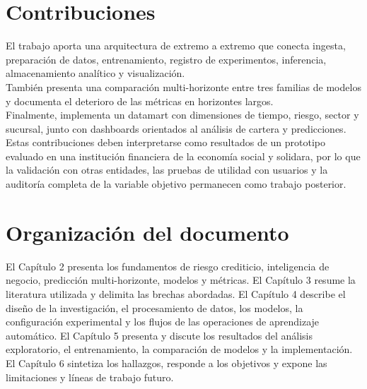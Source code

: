 \section{Contribuciones}

El trabajo aporta una arquitectura de extremo a extremo que conecta ingesta, preparación de datos, entrenamiento, registro de experimentos, inferencia, almacenamiento analítico y visualización.\\

También presenta una comparación multi-horizonte entre tres familias de modelos y documenta el deterioro de las métricas en horizontes largos.\\

Finalmente, implementa un datamart con dimensiones de tiempo, riesgo, sector y sucursal, junto con dashboards orientados al análisis de cartera y predicciones.\\

Estas contribuciones deben interpretarse como resultados de un prototipo evaluado en una institución financiera de la economía social y solidara, por lo que la validación con otras entidades, las pruebas de utilidad con usuarios y la auditoría completa de la variable objetivo permanecen como trabajo posterior.

\section{Organización del documento}

El Capítulo 2 presenta los fundamentos de riesgo crediticio, inteligencia de negocio, predicción multi-horizonte, modelos y métricas. El Capítulo 3 resume la literatura utilizada y delimita las brechas abordadas. El Capítulo 4 describe el diseño de la investigación, el procesamiento de datos, los modelos, la configuración experimental y los flujos de las operaciones de aprendizaje automático. El Capítulo 5 presenta y discute los resultados del análisis exploratorio, el entrenamiento, la comparación de modelos y la implementación. El Capítulo 6 sintetiza los hallazgos, responde a los objetivos y expone las limitaciones y líneas de trabajo futuro.